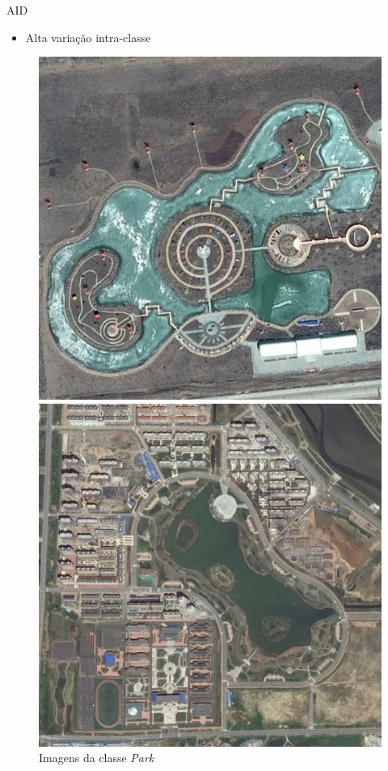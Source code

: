     \begin{frame}{AID}
        \begin{itemize}
            \item Alta variação intra-classe
        \end{itemize}
        \begin{figure}
            \begin{minipage}[b]{0.4\linewidth}
                \centering
                \includegraphics[width=0.9\linewidth]{AID/park_1.jpg}
            \end{minipage}
            \hspace{0.1cm}
            \begin{minipage}[b]{0.4\linewidth}
                \centering
                \includegraphics[width=0.9\linewidth]{AID/park_122.jpg}
            \end{minipage}
            \caption{Imagens da classe \textit{Park}}
        \end{figure}
    
    \end{frame}

